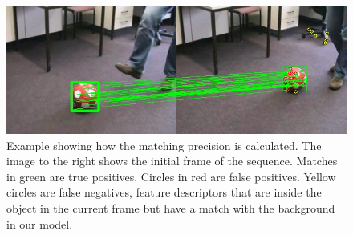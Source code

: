 

\begin{figure}[!htb]
	\includegraphics[width=0.95\linewidth]{imgs/matching.png}
\vspace{-2.5mm}	
\caption{Example showing how the matching precision is calculated. The image to the right shows the initial frame of the sequence. Matches in green are true positives. Circles in red are false positives. Yellow circles are false negatives, feature descriptors that are inside the object in the current frame but have a match with the background in our model.}
\label{fig:matching}
\end{figure}

